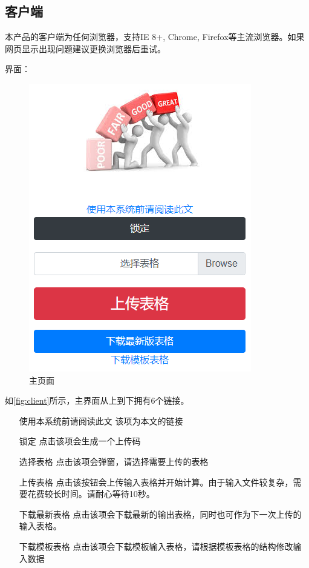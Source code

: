 \documentclass[UTF8,fontset=windowsnew]{ctexart}
\begin{document}
\subsection{客户端}
本产品的客户端为任何浏览器，支持IE 8+, Chrome, Firefox等主流浏览器。如果网页显示出现问题建议更换浏览器后重试。\par
界面：\par
\begin{figure}[h]
  \centering
  \includegraphics[width=.5\textwidth]{image/client.png}
  \caption{主页面}
  \label{fig:client}
\end{figure}
如\autoref{fig:client}所示，主界面从上到下拥有6个链接。\par
\begin{itemize}
  \setlength{\itemindent}{4em}
  \item [使用本系统前请阅读此文] 该项为本文的链接
  \item [锁定] 点击该项会生成一个上传码
  \item [选择表格] 点击该项会弹窗，请选择需要上传的表格
  \item [上传表格] 点击该按钮会上传输入表格并开始计算。由于输入文件较复杂，需要花费较长时间。请耐心等待10秒。
  \item [下载最新表格] 点击该项会下载最新的输出表格，同时也可作为下一次上传的输入表格。
  \item [下载模板表格] 点击该项会下载模板输入表格，请根据模板表格的结构修改输入数据
\end{itemize}
\end{document}
